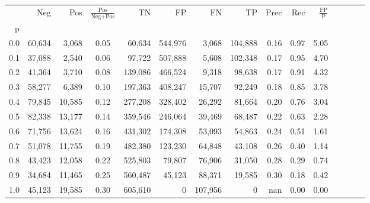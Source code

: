 \begin{tabular}{rrrcrrrrrrrrrrr}
\toprule
{} &     Neg &     Pos & $\frac{\text{Pos}}{\text{Neg}+\text{Pos}}$ &       TN &       FP &       FN &       TP &  Prec &   Rec & $\frac{\text{FP}}{\text{P}}$ \\
p   &         &         &                                            &          &          &          &          &       &       &                              \\
\midrule
0.0 &  60,634 &   3,068 &                                       0.05 &   60,634 &  544,976 &    3,068 &  104,888 &  0.16 &  0.97 &                         5.05 \\
0.1 &  37,088 &   2,540 &                                       0.06 &   97,722 &  507,888 &    5,608 &  102,348 &  0.17 &  0.95 &                         4.70 \\
0.2 &  41,364 &   3,710 &                                       0.08 &  139,086 &  466,524 &    9,318 &   98,638 &  0.17 &  0.91 &                         4.32 \\
0.3 &  58,277 &   6,389 &                                       0.10 &  197,363 &  408,247 &   15,707 &   92,249 &  0.18 &  0.85 &                         3.78 \\
0.4 &  79,845 &  10,585 &                                       0.12 &  277,208 &  328,402 &   26,292 &   81,664 &  0.20 &  0.76 &                         3.04 \\
0.5 &  82,338 &  13,177 &                                       0.14 &  359,546 &  246,064 &   39,469 &   68,487 &  0.22 &  0.63 &                         2.28 \\
0.6 &  71,756 &  13,624 &                                       0.16 &  431,302 &  174,308 &   53,093 &   54,863 &  0.24 &  0.51 &                         1.61 \\
0.7 &  51,078 &  11,755 &                                       0.19 &  482,380 &  123,230 &   64,848 &   43,108 &  0.26 &  0.40 &                         1.14 \\
0.8 &  43,423 &  12,058 &                                       0.22 &  525,803 &   79,807 &   76,906 &   31,050 &  0.28 &  0.29 &                         0.74 \\
0.9 &  34,684 &  11,465 &                                       0.25 &  560,487 &   45,123 &   88,371 &   19,585 &  0.30 &  0.18 &                         0.42 \\
1.0 &  45,123 &  19,585 &                                       0.30 &  605,610 &        0 &  107,956 &        0 &   nan &  0.00 &                         0.00 \\
\bottomrule
\end{tabular}
